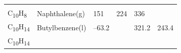 \documentclass[
]{book}
\theoremstyle{definition}
\theoremstyle{definition}
\theoremstyle{definition}
\theoremstyle{remark}
\begin{document}
\begin{longtable}[]{@{}llllll@{}}
\begin{minipage}[t]{0.15\columnwidth}
\strut
\end{minipage} & \begin{minipage}[t]{0.14\columnwidth}\raggedright
\strut
\end{minipage} & \begin{minipage}[t]{0.14\columnwidth}\raggedright
\strut
\end{minipage}\tabularnewline
\begin{minipage}[t]{0.07\columnwidth}\raggedright
C\textsubscript{10}H\textsubscript{8}\strut
\end{minipage} & \begin{minipage}[t]{0.17\columnwidth}\raggedright
Naphthalene(g)\strut
\end{minipage} & \begin{minipage}[t]{0.15\columnwidth}\raggedright
151\strut
\end{minipage} & \begin{minipage}[t]{0.15\columnwidth}\raggedright
224\strut
\end{minipage} & \begin{minipage}[t]{0.14\columnwidth}\raggedright
336\strut
\end{minipage} & \begin{minipage}[t]{0.14\columnwidth}\raggedright
\strut
\end{minipage}\tabularnewline
\begin{minipage}[t]{0.07\columnwidth}\raggedright
C\textsubscript{10}H\textsubscript{14}\strut
\end{minipage} & \begin{minipage}[t]{0.17\columnwidth}\raggedright
Butylbenzene(l)\strut
\end{minipage} & \begin{minipage}[t]{0.15\columnwidth}\raggedright
--63.2\strut
\end{minipage} & \begin{minipage}[t]{0.15\columnwidth}\raggedright
\strut
\end{minipage} & \begin{minipage}[t]{0.14\columnwidth}\raggedright
321.2\strut
\end{minipage} & \begin{minipage}[t]{0.14\columnwidth}\raggedright
243.4\strut
\end{minipage}\tabularnewline
\begin{minipage}[t]{0.07\columnwidth}\raggedright
C\textsubscript{10}H\textsubscript{14}\strut
\end{minipage} & \begin{minipage}[t]{0.17\columnwidth}\raggedright

\end{minipage}
\end{longtable}
\end{document}
